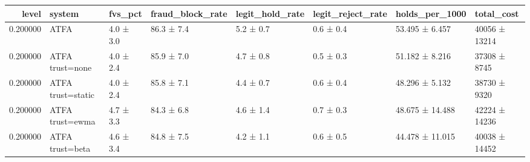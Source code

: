 \begin{tabular}{rlllllll}
\toprule
level & system & fvs\_pct & fraud\_block\_rate & legit\_hold\_rate & legit\_reject\_rate & holds\_per\_1000 & total\_cost \\
\midrule
0.200000 & ATFA & 4.0 ± 3.0 & 86.3 ± 7.4 & 5.2 ± 0.7 & 0.6 ± 0.4 & 53.495 ± 6.457 & 40056 ± 13214 \\
0.200000 & ATFA trust=none & 4.0 ± 2.4 & 85.9 ± 7.0 & 4.7 ± 0.8 & 0.5 ± 0.3 & 51.182 ± 8.216 & 37308 ± 8745 \\
0.200000 & ATFA trust=static & 4.0 ± 2.4 & 85.8 ± 7.1 & 4.4 ± 0.7 & 0.6 ± 0.4 & 48.296 ± 5.132 & 38730 ± 9320 \\
0.200000 & ATFA trust=ewma & 4.7 ± 3.3 & 84.3 ± 6.8 & 4.6 ± 1.4 & 0.7 ± 0.3 & 48.675 ± 14.488 & 42224 ± 14236 \\
0.200000 & ATFA trust=beta & 4.6 ± 3.4 & 84.8 ± 7.5 & 4.2 ± 1.1 & 0.6 ± 0.5 & 44.478 ± 11.015 & 40038 ± 14452 \\
\bottomrule
\end{tabular}
